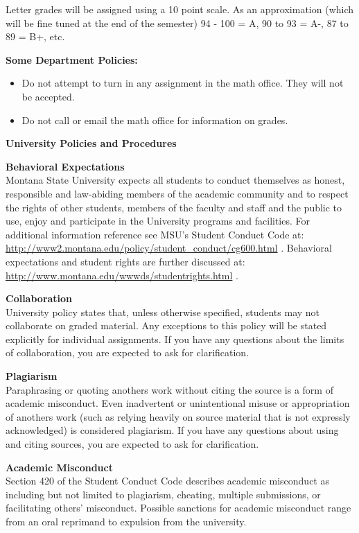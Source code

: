   Letter grades will be assigned using a 10 point scale.
  As an approximation (which will be fine tuned at the end of the semester)
  94 - 100 = A,  90 to 93 = A-, 87 to 89 = B+, etc.
 
{\bf Some Department Policies:}\vspace{-.2in}
\begin{itemize}
\item Do not attempt to turn in any assignment in the math
  office. They will not be accepted.
\item Do not call or email the math office for information on grades.
\end{itemize}

\begin{center}
{\large\bf University Policies and Procedures }  
\end{center}

{\bf Behavioral Expectations }\\
Montana State University expects all students to conduct themselves as
honest, responsible and law-abiding members of the academic community
and to respect the rights of other students, members of the faculty
and staff and the public to use, enjoy and participate in the
University programs and facilities. For additional information
reference see MSU's Student Conduct Code at: 
\url{http://www2.montana.edu/policy/student_conduct/cg600.html} .
Behavioral expectations and student rights are further discussed at:
\url{http://www.montana.edu/wwwds/studentrights.html} . 
 

 {\bf Collaboration }\\
University policy states that, unless otherwise specified, students
may not collaborate on graded material. Any exceptions to this policy
will be stated explicitly for individual assignments. If you have any
questions about the limits of collaboration, you are expected to ask
for clarification. 


 {\bf Plagiarism  }\\
Paraphrasing or quoting anothers work without citing the source is a
form of academic misconduct. Even inadvertent or unintentional misuse
or appropriation of anothers work (such as relying heavily on source
material that is not expressly acknowledged) is considered
plagiarism. If you have any questions about using and citing sources,
you are expected to ask for clarification. 

 {\bf Academic Misconduct  }\\
Section 420 of the Student Conduct Code describes academic misconduct
as including but not limited to plagiarism, cheating, multiple
submissions, or facilitating others’ misconduct. Possible sanctions
for academic misconduct range from an oral reprimand to expulsion from
the university. 

